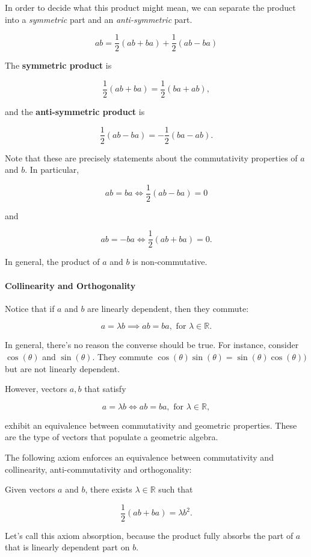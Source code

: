 \documentclass{article}
\begin{document}
In order to decide what this product might mean, we can separate the
product into a \emph{symmetric} part and an \emph{anti-symmetric} part.

$$ab = \frac{1}{2}(ab + ba) + \frac{1}{2}(ab - ba)$$

The \textbf{symmetric product} is

$$\frac{1}{2}(ab + ba) = \frac{1}{2}(ba + ab),$$

and the \textbf{anti-symmetric product} is

$$\frac{1}{2}(ab - ba) = - \frac{1}{2}(ba - ab).$$

Note that these are precisely statements about the commutativity
properties of $a$ and $b$. In particular,

$$ab = ba \iff \frac{1}{2}(ab - ba) = 0$$

and

$$ab = -ba \iff \frac{1}{2}(ab + ba) = 0.$$

In general, the product of $a$ and $b$ is non-commutative.

\paragraph{Collinearity and
Orthogonality}\label{collinearity-and-orthogonality}

Notice that if $a$ and $b$ are linearly dependent, then they
commute:

$$a = \lambda b \implies ab = ba, \text{ for } \lambda \in \mathbb{R}.$$

In general, there's no reason the converse should be true. For instance,
consider $\cos(\theta)$ and $\sin(\theta)$. They commute
$\cos(\theta) \sin(\theta) = \sin(\theta) \cos(\theta))$ but are not
linearly dependent.

However, vectors $a, b$ that satisfy

$$a = \lambda b \iff ab = ba, \text{ for } \lambda \in \mathbb{R},$$

exhibit an equivalence between commutativity and geometric properties.
These are the type of vectors that populate a geometric algebra.

The following axiom enforces an equivalence between commutativity and
collinearity, anti-commutativity and orthogonality:

Given vectors $a$ and $b$, there exists $\lambda \in \mathbb{R}$
such that

$$\frac{1}{2}(ab + ba) = \lambda b^2.$$

Let's call this axiom absorption, because the product fully absorbs the
part of $a$ that is linearly dependent part on $b$.
\end{document}
